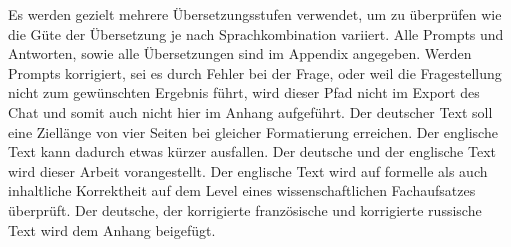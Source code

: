 Es werden gezielt mehrere Übersetzungsstufen verwendet, um zu überprüfen wie die Güte der Übersetzung je nach Sprachkombination variiert. Alle Prompts und Antworten, sowie alle Übersetzungen sind im Appendix angegeben. Werden Prompts korrigiert, sei es durch Fehler bei der Frage, oder weil die Fragestellung nicht zum gewünschten Ergebnis führt, wird dieser Pfad nicht im Export des Chat und somit auch nicht hier im Anhang aufgeführt.
Der deutscher Text soll eine Ziellänge von vier Seiten bei gleicher Formatierung erreichen. Der englische Text kann dadurch etwas kürzer ausfallen. Der deutsche und der englische Text wird dieser Arbeit vorangestellt. 
Der englische Text wird auf formelle als auch inhaltliche Korrektheit auf dem Level eines wissenschaftlichen Fachaufsatzes überprüft. Der deutsche, der korrigierte französische und korrigierte russische Text wird dem Anhang beigefügt.
